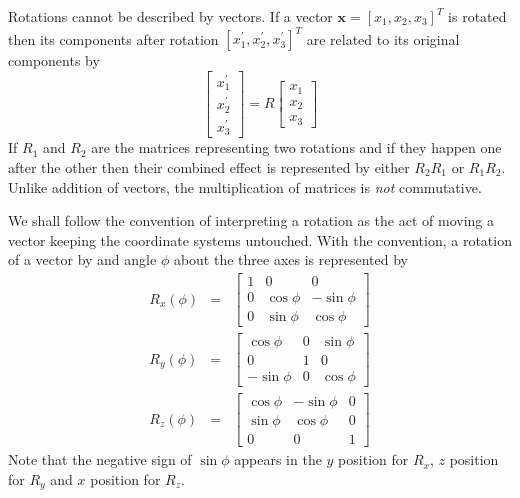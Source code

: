 \documentclass{article}
\numberwithin{equation}{section}
\let\vec\bm
\theoremstyle{plain}
\numberwithin{thm}{section}
\theoremstyle{plain}
\numberwithin{prop}{section}
\theoremstyle{definition}
\numberwithin{defn}{section}
\theoremstyle{remark}
\begin{document}
Rotations cannot be described by vectors. If a vector $\vec{x} =
[x_1, x_2, x_3]^T$ is rotated then its components after rotation $[x_1^\prime, 
x_2^\prime, x_3^\prime]^T$ are related to its original components by 
\begin{equation}\label{s2e1}
\begin{bmatrix}x_1^\prime \\ x_2^\prime \\ x_3^\prime\end{bmatrix} = 
R\begin{bmatrix}x_1 \\ x_2 \\ x_3\end{bmatrix} 
\end{equation}
If $R_1$ and $R_2$ are the matrices representing two rotations and if they 
happen one after the other then their combined effect is represented by either
$R_2R_1$ or $R_1R_2$. Unlike addition of vectors, the multiplication of
matrices is \emph{not} commutative.

We shall follow the convention of interpreting a rotation as the act of moving
a vector keeping the coordinate systems untouched. With the convention, a
rotation of a vector by and angle $\phi$ about the three axes is represented
by
\begin{eqnarray}
R_x(\phi) &=& \begin{bmatrix}1 & 0 & 0 \\
0 & \cos\phi & -\sin\phi \\
0 & \sin\phi & \cos\phi
\end{bmatrix} \label{s2e2} \\
R_y(\phi) &=& \begin{bmatrix}\cos\phi & 0 & \sin\phi \\
0 & 1 & 0 \\
-\sin\phi & 0 & \cos\phi
\end{bmatrix} \label{s2e3} \\
R_z(\phi) &=& \begin{bmatrix}\cos\phi & -\sin\phi & 0 \\
\sin\phi & \cos\phi & 0 \\
0 & 0 & 1
\end{bmatrix} \label{s2e4}
\end{eqnarray}
Note that the negative sign of $\sin\phi$ appears in the $y$ position for $R_x$,
 $z$ position for $R_y$ and $x$ position for $R_z$.
\end{document}
